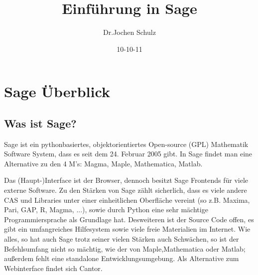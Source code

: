 \documentclass[fontsize=12pt,paper=a4,twoside,bibtotoc,idxtotoc,
liststotoc,pagesize,BCOR1.2cm,DIV15,chapterprefix,pagesize=pdftex]{scrbook}
\title{Einführung in Sage}
\author{Dr.Jochen Schulz}
\date{10-10-11}
\theoremstyle{plain}
\theoremstyle{definition}
\theoremstyle{remark}
\begin{document}
\maketitle
\tableofcontents
\chapter{Sage Überblick}
\section{Was ist Sage?}
Sage ist ein pythonbasiertes, objektorientiertes Open-source (GPL) Mathematik Software System, dass es seit dem 24. Februar 2005 gibt.
In Sage findet man eine Alternative zu den 4 M's: Magma, Maple, Mathematica, Matlab.

Das (Haupt-)Interface ist der Browser, dennoch besitzt Sage Frontends für viele externe Software.
Zu den Stärken von Sage zählt sicherlich, dass es viele andere CAS und Libraries unter einer einheitlichen Oberfläche vereint 
(so z.B. Maxima, Pari, GAP, R, Magma, ...), sowie durch Python eine sehr mächtige Programmiersprache als Grundlage hat. Desweiteren 
ist der Source Code offen, es gibt ein umfangreiches Hilfesystem sowie viele freie Materialien im Internet.
Wie alles, so hat auch Sage trotz seiner vielen Stärken auch Schwächen, so ist der Befehlsumfang nicht so mächtig, wie der von Maple,Mathematica 
oder Matlab; außerdem fehlt eine standalone Entwicklungsumgebung. Als Alternative zum Webinterface findet sich Cantor.
\end{document}
